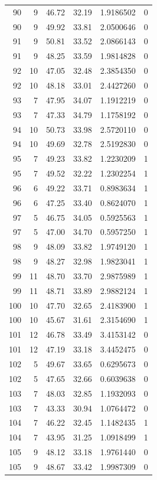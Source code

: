 \documentclass[
  letterpaper,
  DIV=11,
  numbers=noendperiod]{scrreprt}
\renewcommand{\[}{\begin{equation}}
\renewcommand{\]}{\end{equation}}
\begin{document}
\begin{table}
\begin{tabular*}{\linewidth}{@{\extracolsep{\fill}}rrrrrr}
90 & 9 & 46.72 & 32.19 & 1.9186502 & 0 \\ 
90 & 9 & 49.92 & 33.81 & 2.0500646 & 0 \\ 
91 & 9 & 50.81 & 33.52 & 2.0866143 & 0 \\ 
91 & 9 & 48.25 & 33.59 & 1.9814828 & 0 \\ 
92 & 10 & 47.05 & 32.48 & 2.3854350 & 0 \\ 
92 & 10 & 48.18 & 33.01 & 2.4427260 & 0 \\ 
93 & 7 & 47.95 & 34.07 & 1.1912219 & 0 \\ 
93 & 7 & 47.33 & 34.79 & 1.1758192 & 0 \\ 
94 & 10 & 50.73 & 33.98 & 2.5720110 & 0 \\ 
94 & 10 & 49.69 & 32.78 & 2.5192830 & 0 \\ 
95 & 7 & 49.23 & 33.82 & 1.2230209 & 1 \\ 
95 & 7 & 49.52 & 32.22 & 1.2302254 & 1 \\ 
96 & 6 & 49.22 & 33.71 & 0.8983634 & 1 \\ 
96 & 6 & 47.25 & 33.40 & 0.8624070 & 1 \\ 
97 & 5 & 46.75 & 34.05 & 0.5925563 & 1 \\ 
97 & 5 & 47.00 & 34.70 & 0.5957250 & 1 \\ 
98 & 9 & 48.09 & 33.82 & 1.9749120 & 1 \\ 
98 & 9 & 48.27 & 32.98 & 1.9823041 & 1 \\ 
99 & 11 & 48.70 & 33.70 & 2.9875989 & 1 \\ 
99 & 11 & 48.71 & 33.89 & 2.9882124 & 1 \\ 
100 & 10 & 47.70 & 32.65 & 2.4183900 & 1 \\ 
100 & 10 & 45.67 & 31.61 & 2.3154690 & 1 \\ 
101 & 12 & 46.78 & 33.49 & 3.4153142 & 0 \\ 
101 & 12 & 47.19 & 33.18 & 3.4452475 & 0 \\ 
102 & 5 & 49.67 & 33.65 & 0.6295673 & 0 \\ 
102 & 5 & 47.65 & 32.66 & 0.6039638 & 0 \\ 
103 & 7 & 48.03 & 32.85 & 1.1932093 & 0 \\ 
103 & 7 & 43.33 & 30.94 & 1.0764472 & 0 \\ 
104 & 7 & 46.22 & 32.45 & 1.1482435 & 1 \\ 
104 & 7 & 43.95 & 31.25 & 1.0918499 & 1 \\ 
105 & 9 & 48.12 & 33.18 & 1.9761440 & 0 \\ 
105 & 9 & 48.67 & 33.42 & 1.9987309 & 0 \\ 

\end{tabular*}
\end{table}
\end{document}
